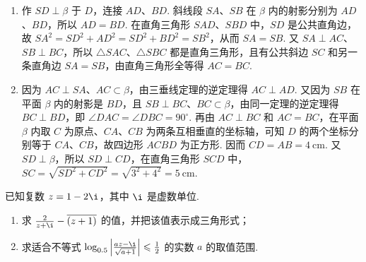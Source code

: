 \begin{solution}
\begin{enumerate}
\item 作 \(SD\perp\beta\) 于 \(D\)，连接 \(AD\)、\(BD\). 斜线段 \(SA\)、\(SB\) 在 \(\beta\) 内的射影分别为 \(AD\)、\(BD\)，所以 \(AD=BD\). 在直角三角形 \(SAD\)、\(SBD\) 中，\(SD\) 是公共直角边，故 \(SA^2=SD^2+AD^2=SD^2+BD^2=SB^2\)，从而 \(SA=SB\). 又 \(SA\perp AC\)、\(SB\perp BC\)，所以 \(\triangle SAC\)、\(\triangle SBC\) 都是直角三角形，且有公共斜边 \(SC\) 和另一条直角边 \(SA=SB\)，由直角三角形全等得 \(AC=BC\).
\item 因为 \(AC\perp SA\)、\(AC\subset\beta\)，由三垂线定理的逆定理得 \(AC\perp AD\). 又因为 \(SB\) 在平面 \(\beta\) 内的射影是 \(BD\)，且 \(SB\perp BC\)、\(BC\subset\beta\)，由同一定理的逆定理得 \(BC\perp BD\)，即 \(\angle DAC=\angle DBC=90^\circ\). 再由 \(AC\perp BC\) 和 \(AC=BC\)，在平面 \(\beta\) 内取 \(C\) 为原点、\(CA\)、\(CB\) 为两条互相垂直的坐标轴，可知 \(D\) 的两个坐标分别等于 \(CA\)、\(CB\)，故四边形 \(ACBD\) 为正方形. 因而 \(CD=AB=4\mathrm{~cm}\). 又 \(SD\perp\beta\)，所以 \(SD\perp CD\)，在直角三角形 \(SCD\) 中，\(SC=\sqrt{SD^2+CD^2}=\sqrt{3^2+4^2}=5\mathrm{~cm}\).
\end{enumerate}

\end{solution}

\begin{problem}

已知复数 \(z = 1 - 2\i\)，其中 \(\i\) 是虚数单位.

\begin{enumerate}
\item 求 \(\frac{2}{z + \i} - \overline{(z + 1)}\) 的值，并把该值表示成三角形式；
\item 求适合不等式 \(\log_{0.5}\left|\frac{az - \i}{\sqrt{a + 1}}\right| \leqslant \frac{1}{2}\) 的实数 \(a\) 的取值范围.
\end{enumerate}
\end{problem}

